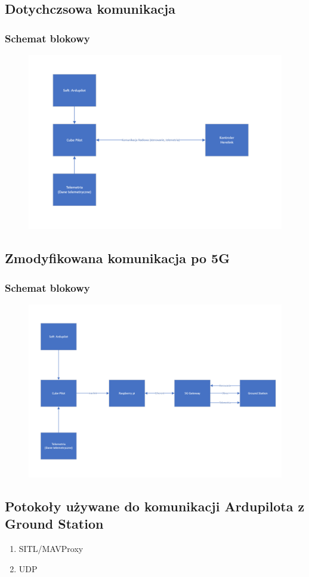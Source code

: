 \documentclass{article}
\begin{document}
\subsection{Dotychczsowa komunikacja}
\subsubsection{Schemat blokowy}
\begin{figure}[H]
    \centering
    \includegraphics[width=0.7 \textwidth]{przed.png}
    \label{fig:obraz1}
\end{figure}

\subsection{Zmodyfikowana komunikacja po 5G}
\subsubsection{Schemat blokowy}
\begin{figure}[H]
    \centering
    \includegraphics[width=0.7 \textwidth]{po.png}
    \label{fig:obraz2}
\end{figure}

\subsection{Potokoły używane do komunikacji Ardupilota z Ground Station}
\begin{enumerate}
    \item SITL/MAVProxy
    \item UDP
\end{enumerate}
\end{document}
